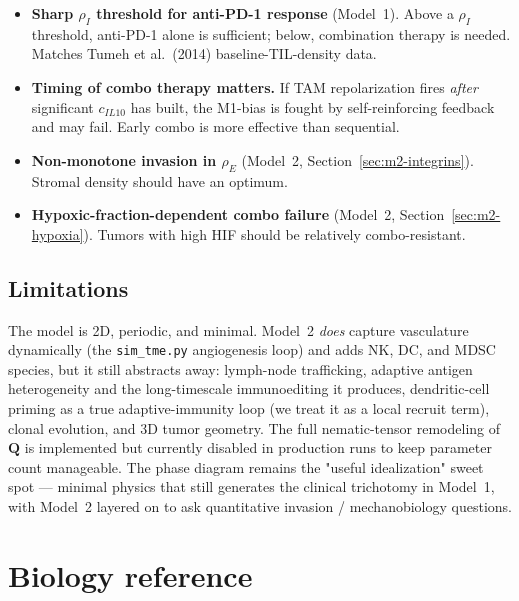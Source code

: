 \documentclass[11pt,letterpaper]{article}
\begin{document}
\begin{itemize}[nosep,leftmargin=*]
  \item \textbf{Sharp $\rho_I$ threshold for anti-PD-1 response}
        (Model~1). Above a $\rho_I$ threshold, anti-PD-1 alone is
        sufficient; below, combination therapy is needed. Matches
        Tumeh et al.\ (2014) baseline-TIL-density data.
  \item \textbf{Timing of combo therapy matters.} If TAM
        repolarization fires \emph{after} significant $c_{IL10}$ has
        built, the M1-bias is fought by self-reinforcing feedback and
        may fail. Early combo is more
        effective than sequential.
  \item \textbf{Non-monotone invasion in $\rho_E$} (Model~2,
        Section~\ref{sec:m2-integrins}). Stromal density should have an
        optimum.
  \item \textbf{Hypoxic-fraction-dependent combo failure} (Model~2,
        Section~\ref{sec:m2-hypoxia}). Tumors with high HIF should be
        relatively combo-resistant.
\end{itemize}

\subsection{Limitations}

The model is 2D, periodic, and minimal. Model~2 \emph{does} capture
vasculature dynamically (the \texttt{sim\_tme.py} angiogenesis loop) and
adds NK, DC, and MDSC species, but it still abstracts away: lymph-node
trafficking, adaptive antigen heterogeneity and the long-timescale
immunoediting it produces, dendritic-cell priming as a true
adaptive-immunity loop (we treat it as a local recruit term), clonal
evolution, and 3D tumor geometry. The full nematic-tensor remodeling
of $\mathbf{Q}$ is implemented but currently disabled in production
runs to keep parameter count manageable. The phase diagram remains the
"useful idealization" sweet spot --- minimal physics that still
generates the clinical trichotomy in Model~1, with Model~2 layered on
to ask quantitative invasion / mechanobiology questions.

\appendix
\section*{Biology reference}
\label{sec:bioref}
\end{document}

